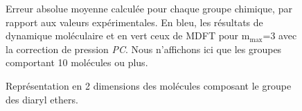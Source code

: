 \begin{figure}[H]
  \centering
  \caption{Erreur absolue moyenne calculée pour chaque groupe chimique, par rapport aux valeurs expérimentales. En bleu, les résultats de dynamique moléculaire et en vert ceux de MDFT pour $\mathrm{m}_\mathrm{max}$=3 avec la correction de pression \textit{PC}. Nous n'affichons ici que les groupes comportant 10 molécules ou plus.}
  \label{fig:AUE:mmax3}
\end{figure}



\begin{figure}[H]
  \centering
  \caption{Représentation en 2 dimensions des molécules composant le groupe des diaryl ethers.}
  \label{fig:diaryl_ether}
\end{figure}

